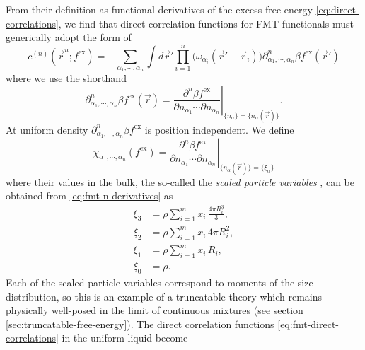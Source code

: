 From their definition as functional derivatives of the excess free energy \eqref{eq:direct-correlations}, we find that direct correlation functions for FMT functionals must generically adopt the form of \cite{RosenfeldPRL1989}
\begin{equation}\label{eq:fmt-direct-correlations}
  c^{(n)}(\vec{r}^n; f^\mathrm{ex})
  =
  - \sum_{\alpha_1, \cdots, \alpha_n}
  \int d\vec{r}'
  \prod_{i=1}^n \Big( \omega_{\alpha_i}(\vec{r}' - \vec{r}_i) \Big)
  \partial^n_{\alpha_1, \cdots, \alpha_n} \beta f^\mathrm{ex}(\vec{r}')
\end{equation}
where we use the shorthand 
\begin{equation*}
  \partial^n_{\alpha_1, \cdots, \alpha_n} \beta f^\mathrm{ex}(\vec{r}) =
  \left.
  \frac{\partial^n \beta f^\mathrm{ex}}{\partial n_{\alpha_1} \cdots \partial n_{\alpha_n}}
  \right|_{\{n_\alpha\} = \{n_\alpha(\vec{r})\}}.
\end{equation*}
At uniform density $\partial^n_{\alpha_1, \cdots, \alpha_n} \beta f^\mathrm{ex}$ is position independent.
We define
\begin{equation}
  \chi_{\alpha_1, \cdots, \alpha_n}(f^\mathrm{ex})
  =
  \left.
  \frac{\partial^n \beta f^\mathrm{ex}}{\partial n_{\alpha_1} \cdots \partial n_{\alpha_n}}
  \right|_{\{n_\alpha(\vec{r})\} = \{\xi_\alpha\}}
\end{equation}
where their values in the bulk, the so-called the \emph{scaled particle variables}%
,
can be obtained from \eqref{eq:fmt-n-derivatives} as
\begin{subequations}\label{eq:spt-variables}
  \begin{align}
    \xi_3
    &=
    \rho \sum_{i=1}^m x_i \,
    \frac{4 \pi R_i^3}{3},
    \\
    \xi_2
    &=
    \rho \sum_{i=1}^m x_i \,
    4 \pi R_i^2,
    \\
    \xi_1
    &=
    \rho \sum_{i=1}^m x_i \,
    R_i,
    \\
    \xi_0
    &=
    \rho.
  \end{align}
\end{subequations}
Each of the scaled particle variables correspond to moments of the size distribution, so this is an example of a truncatable theory which remains physically well-posed in the limit of continuous mixtures (see section \ref{sec:truncatable-free-energy}).
The direct correlation functions \eqref{eq:fmt-direct-correlations} in the uniform liquid become \cite{RosenfeldJCP1990}
